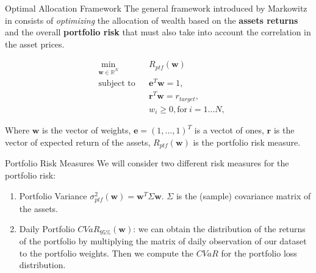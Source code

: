 \documentclass[c, 10pt]{beamer}
\begin{document}
\begin{frame}{Optimal Allocation Framework}
The general framework introduced by Markowitz in \citep{MARKOWITZ1952} consists of \textit{optimizing} the allocation of wealth based on the \textbf{assets returns} and the overall \textbf{portfolio risk} that must also take into account the correlation in the asset prices.

\begin{subequations}
	\begin{align}
	&\!\min_{\mathbf{w}\in \mathbb{R}^{N}}     &    & R_{ptf}(\mathbf{w}) \nonumber\\
	& \text{subject to}   &   & \mathbf{e}^T\mathbf{w} = 1 ,\nonumber\\
	&                 &       & \mathbf{r}^T\mathbf{w} = r_{target},\label{eq:constraint2a} \nonumber\\
	&		   &      & w_{i} \geq 0, \text{for} \: i = 1\dots N,\nonumber
	\end{align}
\end{subequations}

Where $\mathbf{w}$ is the vector of weights, $\mathbf{e} = (1,...,1)^T$ is a vectot of ones, $\mathbf{r}$ is the vector of expected return of the assets, $R_{ptf}(\mathbf{w})$ is the portfolio risk measure.


\end{frame}

\begin{frame}{Portfolio Risk Measures}
We will consider two different risk measures for the portfolio risk:
\begin{enumerate}
	\item Portfolio Variance $\sigma_{ptf}^2(\mathbf{w}) = \mathbf{w}^T \Sigma \mathbf{w}$. $\Sigma$ is the (sample) covariance matrix of the assets.
	\item Daily Portfolio $CVaR_{95\%}(\mathbf{w})$: we can obtain the distribution of the returns of the portfolio by multiplying the matrix of daily observation of our dataset to the portfolio weights. Then we compute the $CVaR$ for the  portfolio loss distribution.
\end{enumerate}

\begin{figure}
	\centering
	\noindent{}
\end{figure}
\end{frame}
\end{document}
